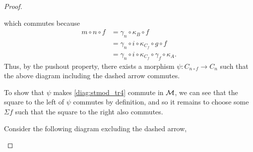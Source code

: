 \begin{proof}
\begin{enumerate}[label={(\bfseries TR\arabic*)}]
{\begin{center}
            \end{center}
            which commutes because
            \begin{equation}
                \label{diag:stmod_tr4_m_n_f_equal_something_else}
                \begin{aligned}
                    m \circ n \circ f &= \gamma_n \circ \kappa_B \circ f \\
                    &= \gamma_n \circ i \circ \kappa_{C_f} \circ g \circ f \\
                    &= \gamma_n \circ i \circ \kappa_{C_f} \circ \gamma_f \circ \kappa_A.
                \end{aligned}
            \end{equation}
            Thus, by the pushout property, there exists a morphism \( \psi: C_{n \circ f} \to C_n \) such that the above diagram including the dashed arrow commutes.

            To show that \( \psi \) makes \autoref{diag:stmod_tr4} commute in \( {\mathcal{M}} \), we can see that the square to the left of \( \psi \) commutes by definition, and so it remains to choose some \( \Sigma f \) such that the square to the right also commutes.

            Consider the following diagram excluding the dashed arrow,
            \begin{center}
\end{center}}
\end{enumerate}
\end{proof}
